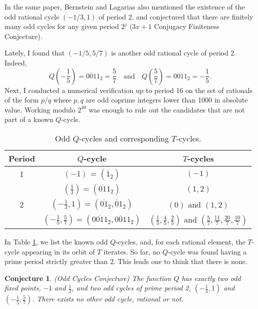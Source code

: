 \documentclass[12pt]{article}
\newtheorem{conjecture}{Conjecture}
\theoremstyle{definition}
\begin{document}
{In the same paper, Bernstein and Lagarias also mentioned the existence of the odd rational cycle $(-1/3, 1)$ of period 2, and conjectured that there are finitely many odd cycles for any given period $2^j$ ($3x+1$ Conjugacy Finiteness Conjecture).

Lately, I found that $(-1/5, 5/7)$ is another odd rational cycle of period 2. Indeed, 
$$Q\left( -\frac{1}{5}\right) = \overline{001}1_2 = \frac{5}{7} \quad \text{and} \quad Q\left( \frac{5}{7}\right) = \overline{0011}_2 = -\frac{1}{5}.$$
Next, I conducted a numerical verification up to period 16 on the set of rationals of the form $p/q$ where $p,q$ are odd coprime integers lower than 1000 in absolute value. Working modulo $2^{40}$ was enough to rule out the candidates that are not part of a known $Q$-cycle.

\begin{table}
\caption{Odd $Q$-cycles and corresponding $T$-cycles.}
\label{tab:cycles}
\begin{center}
\begin{tabular}{|c|c|c|}
\hline
Period & $Q$-cycle & $T$-cycles \\
\hline
\hline
1 & $(-1)$ = $\left( \overline{1}_2\right) $ & $(-1)$ \\
 & $\left( \frac{1}{3} \right) = \left(\overline{01}1_2\right)$ & $(1,2)$ \\
\hline
2 & $\left( -\frac{1}{3} , 1\right) = \left(\overline{01}_2,\overline{0}1_2\right)$ & $(0)$ and $(1,2)$ \\
 & $\left( -\frac{1}{5} , \frac{5}{7}\right) = \left(\overline{0011}_2, \overline{001}1_2\right)$ & $\left( \frac{1}{5}, \frac{4}{5}, \frac{2}{5} \right) $ and $\left( \frac{5}{7}, \frac{11}{7}, \frac{20}{7}, \frac{10}{7}\right)$ \\
\hline
\end{tabular}
\end{center}
\end{table}

In Table \ref{tab:cycles}, we list the known odd $Q$-cycles, and, for each rational element, the $T$-cycle appearing in its orbit of $T$ iterates. So far, no $Q$-cycle was found having a prime period strictly greater than 2. This leads one to think that there is none.

\begin{conjecture} {\em (Odd Cycles Conjecture)}
\label{conj:cycles}
The function $Q$ has exactly two odd fixed points, $-1$ and $\frac{1}{3}$, and two odd cycles of prime period 2,  $\left( -\frac{1}{3}, 1\right) $ and $\left( -\frac{1}{5}, \frac{5}{7}\right) $. There exists no other odd cycle, rational or not.
\end{conjecture}

}
\end{document}
